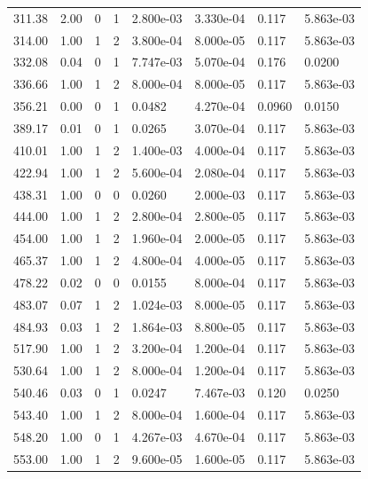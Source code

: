 \documentclass[preview]{standalone}
\begin{document}
{{\begin{tabular}{L{1.2cm}C{1.2cm} C{0.3cm}C{0.5cm} C{1.4cm}C{1.4cm} C{1.4cm}C{1.4cm}}
  311.38  &  2.00  & 0     &  1 &  2.800e-03  & 3.330e-04  & 0.117 &  5.863e-03   \\ 
  314.00  &  1.00  & 1     &  2 &  3.800e-04  & 8.000e-05  & 0.117 &  5.863e-03   \\ 
  332.08  &  0.04  & 0     &  1 &  7.747e-03  & 5.070e-04  & 0.176 &  0.0200   \\ 
  336.66  &  1.00  & 1     &  2 &  8.000e-04  & 8.000e-05  & 0.117 &  5.863e-03   \\ 
  356.21  &  0.00  & 0     &  1 &  0.0482  & 4.270e-04  & 0.0960 &  0.0150   \\ 
  389.17  &  0.01  & 0     &  1 &  0.0265  & 3.070e-04  & 0.117 &  5.863e-03   \\ 
  410.01  &  1.00  & 1     &  2 &  1.400e-03  & 4.000e-04  & 0.117 &  5.863e-03   \\ 
  422.94  &  1.00  & 1     &  2 &  5.600e-04  & 2.080e-04  & 0.117 &  5.863e-03   \\ 
  438.31  &  1.00  & 0     &  0 &  0.0260  & 2.000e-03  & 0.117 &  5.863e-03   \\ 
  444.00  &  1.00  & 1     &  2 &  2.800e-04  & 2.800e-05  & 0.117 &  5.863e-03   \\ 
  454.00  &  1.00  & 1     &  2 &  1.960e-04  & 2.000e-05  & 0.117 &  5.863e-03   \\ 
  465.37  &  1.00  & 1     &  2 &  4.800e-04  & 4.000e-05  & 0.117 &  5.863e-03   \\ 
  478.22  &  0.02  & 0     &  0 &  0.0155  & 8.000e-04  & 0.117 &  5.863e-03   \\ 
  483.07  &  0.07  & 1     &  2 &  1.024e-03  & 8.000e-05  & 0.117 &  5.863e-03   \\ 
  484.93  &  0.03  & 1     &  2 &  1.864e-03  & 8.800e-05  & 0.117 &  5.863e-03   \\ 
  517.90  &  1.00  & 1     &  2 &  3.200e-04  & 1.200e-04  & 0.117 &  5.863e-03   \\ 
  530.64  &  1.00  & 1     &  2 &  8.000e-04  & 1.200e-04  & 0.117 &  5.863e-03   \\ 
  540.46  &  0.03  & 0     &  1 &  0.0247  & 7.467e-03  & 0.120 &  0.0250   \\ 
  543.40  &  1.00  & 1     &  2 &  8.000e-04  & 1.600e-04  & 0.117 &  5.863e-03   \\ 
  548.20  &  1.00  & 0     &  1 &  4.267e-03  & 4.670e-04  & 0.117 &  5.863e-03   \\ 
  553.00  &  1.00  & 1     &  2 &  9.600e-05  & 1.600e-05  & 0.117 &  5.863e-03   \\ 

\end{tabular}}}
\end{document}

